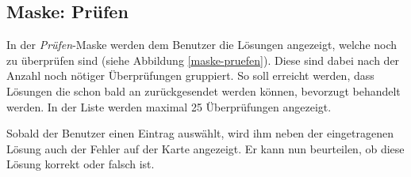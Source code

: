 \subsection{Maske: Prüfen}
In der \emph{Prüfen}-Maske werden dem Benutzer die Lösungen angezeigt, welche noch zu überprüfen sind (siehe Abbildung \ref{maske-pruefen}).
Diese sind dabei nach der Anzahl noch nötiger Überprüfungen gruppiert.
So soll erreicht werden, dass Lösungen die schon bald an  zurückgesendet werden können, bevorzugt behandelt werden.
In der Liste werden maximal 25 Überprüfungen angezeigt.

Sobald der Benutzer einen Eintrag auswählt, wird ihm neben der eingetragenen Lösung auch der Fehler auf der Karte angezeigt.
Er kann nun beurteilen, ob diese Lösung korrekt oder falsch ist.

\begin{figure}[H]
\hfill
{}

\end{figure}
